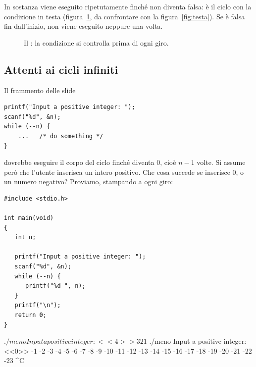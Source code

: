 In sostanza  viene eseguito ripetutamente finché
 non diventa falsa: è il ciclo con la condizione in testa
(figura~\ref{fig:while}, da confrontare con la figura~\ref{fig:testa}). Se
 è falsa fin dall'inizio,  non viene eseguito
neppure una volta.

\begin{figure}[H]
  \centering
  \caption{Il : la condizione si controlla prima di ogni giro.}
  \label{fig:while}
\end{figure}

\subsection{Attenti ai cicli infiniti}

Il frammento delle slide

\begin{lstlisting}[style=c]
printf("Input a positive integer: ");
scanf("%d", &n);
while (--n) {
    ...   /* do something */
}
\end{lstlisting}

dovrebbe eseguire il corpo del ciclo finché  diventa 0, cioè
$n - 1$ volte. Si assume però che l'utente inserisca un intero positivo.
Che cosa succede se inserisce 0, o un numero negativo? Proviamo, stampando
 a ogni giro:

\begin{affianco}[0.5][c]
\begin{lstlisting}[style=c, name=meno.c]
#include <stdio.h>

int main(void)
{
   int n;

   printf("Input a positive integer: ");
   scanf("%d", &n);
   while (--n) {
      printf("%d ", n);
   }
   printf("\n");
   return 0;
}
\end{lstlisting}
\risultato
\begin{console}
$ ./meno
Input a positive integer: <<4>>
3 2 1
$ ./meno
Input a positive integer: <<0>>
-1 -2 -3 -4 -5 -6 -7 -8 -9 -10 -11 -12 -13 -14 -15 -16 -17 -18 -19 -20 -21 -22 -23
^C
\end{console}
\end{affianco}

